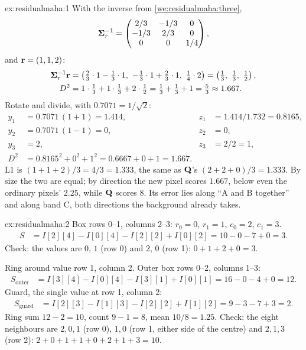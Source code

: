 
\begin{solution}{ex:residualmaha:1}
With the inverse from \cref{we:residualmaha:three},
\[
\boldsymbol{\Sigma}_r^{-1}=\begin{pmatrix}2/3&-1/3&0\\-1/3&2/3&0\\0&0&1/4\end{pmatrix},
\]
and $\mathbf{r}=(1,1,2)$:
\begin{align*}
\Cov_r\inv\vect{r} &= \left(\tfrac23\cdot1-\tfrac13\cdot1,\ -\tfrac13\cdot1+\tfrac23\cdot1,\ \tfrac14\cdot2\right)
 = \left(\tfrac13,\ \tfrac13,\ \tfrac12\right),\\
D^2 &= 1\cdot\tfrac13+1\cdot\tfrac13+2\cdot\tfrac12 = \tfrac13+\tfrac13+1 = \tfrac53 \approx 1.667.
\end{align*}
Rotate and divide, with $0.7071=1/\sqrt2$:
\begin{align*}
y_1 &= 0.7071\,(1+1) = 1.414, & z_1 &= 1.414/1.732 = 0.8165,\\
y_2 &= 0.7071\,(1-1) = 0, & z_2 &= 0,\\
y_3 &= 2, & z_3 &= 2/2 = 1,\\
D^2 &= 0.8165^2+0^2+1^2 = 0.6667+0+1 = 1.667.
\end{align*}
L1 is $(1+1+2)/3=4/3=1.333$, the same as $\mathbf{Q}$'s $(2+2+0)/3=1.333$. By size the two are equal; by
direction the new pixel scores $1.667$, below even the ordinary pixels' $2.25$, while $\mathbf{Q}$ scores 8. Its
error lies along ``A and B together'' and along band C, both directions the background already takes.
\end{solution}

\begin{solution}{ex:residualmaha:2}
Box rows 0--1, columns 2--3: $r_0=0$, $r_1=1$, $c_0=2$, $c_1=3$.
\begin{align*}
S &= I[2][4]-I[0][4]-I[2][2]+I[0][2] = 10-0-7+0 = 3.
\end{align*}
Check: the values are $0$, $1$ (row 0) and $2$, $0$ (row 1): $0+1+2+0=3$.

Ring around value row 1, column 2. Outer box rows 0--2, columns 1--3:
\begin{align*}
S_{\text{outer}} &= I[3][4]-I[0][4]-I[3][1]+I[0][1] = 16-0-4+0 = 12.
\end{align*}
Guard, the single value at row 1, column 2:
\begin{align*}
S_{\text{guard}} &= I[2][3]-I[1][3]-I[2][2]+I[1][2] = 9-3-7+3 = 2.
\end{align*}
Ring sum $12-2=10$, count $9-1=8$, mean $10/8=1.25$. Check: the eight neighbours are $2,0,1$ (row 0),
$1,0$ (row 1, either side of the centre) and $2,1,3$ (row 2): $2+0+1+1+0+2+1+3=10$.
\end{solution}

